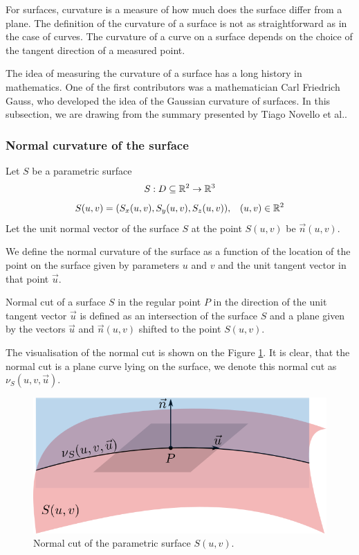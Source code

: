 For surfaces, curvature is a measure of how much does the surface differ from a 
plane. The definition of the curvature of a surface is not as straightforward
as in the case of curves. The curvature of a curve on a surface depends on the 
choice of the tangent direction of a measured point.

The idea of measuring the curvature of a surface has a long history in mathematics.
One of the first contributors was a mathematician Carl Friedrich Gauss, who developed
the idea of the Gaussian curvature of surfaces. In this subsection, we are drawing from
the summary presented by Tiago Novello et al.\cite{novello2021differential}.

\subsubsection*{Normal curvature of the surface}

Let $S$ be a parametric surface $$S: D \subseteq \mathbb{R}^2 \to \mathbb{R}^3$$ 
$$S(u, v) = (S_x(u,v), S_y(u,v), S_z(u,v)), \hspace{3mm} (u,v)\in \mathbb{R}^2$$
Let the unit normal vector of the surface $S$ at the point $S(u, v)$ be $\vec{n}(u, v)$.

We define the normal curvature of the surface as a function of the location of the point
on the surface given by parameters $u$ and $v$ and the unit tangent vector in that point $\vec{u}$. 

\begin{definition}
Normal cut of a surface $S$ in the regular point $P$ in the direction of the unit tangent vector 
$\vec{u}$ is defined as an intersection of the surface $S$ and a plane
given by the vectors $\vec{u}$ and $\vec{n}(u, v)$ shifted to 
the point $S(u, v)$. 
\end{definition}

The visualisation of the normal cut is shown on the Figure \ref{img:14}.
It is clear, that the
normal cut is a plane curve lying on the surface, we denote this normal cut as $\nu_S(u, v, \vec{u})$.

\begin{figure}
    \centerline{\includegraphics[scale=0.5]{images/img14}}
    \caption[Normal cut]
    {Normal cut of the parametric surface $S(u,v)$.}
    \label{img:14}
\end{figure}

